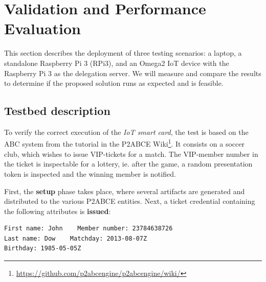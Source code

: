 \section{Validation and Performance Evaluation}\label{ch:validation}


This section describes the deployment of three testing scenarios: a laptop, a standalone Raspberry Pi 3 (RPi3), and an Omega2 IoT device with the Raspberry Pi 3 as the delegation server. We will measure and compare the results to determine if the proposed solution runs as expected and is feasible.

\subsection{Testbed description}



To verify the correct execution of the \textit{IoT smart card}, the test is based on the ABC system from the tutorial in the P2ABCE Wiki\footnote{\url{https://github.com/p2abcengine/p2abcengine/wiki/}}. It consists on a soccer club, which wishes to issue VIP-tickets for a match. The VIP-member number in the ticket is inspectable for a lottery, ie. after the game, a random presentation token is inspected and the winning member is notified.

First, the \textbf{setup} phase takes place, where several artifacts are generated and distributed to the various P2ABCE entities. Next, a ticket credential containing the following attributes is \textbf{issued}:
\begin{Verbatim}[fontsize=\footnotesize]
First name: John	Member number: 23784638726	
Last name: Dow	  Matchday: 2013-08-07Z
Birthday: 1985-05-05Z
\end{Verbatim}


